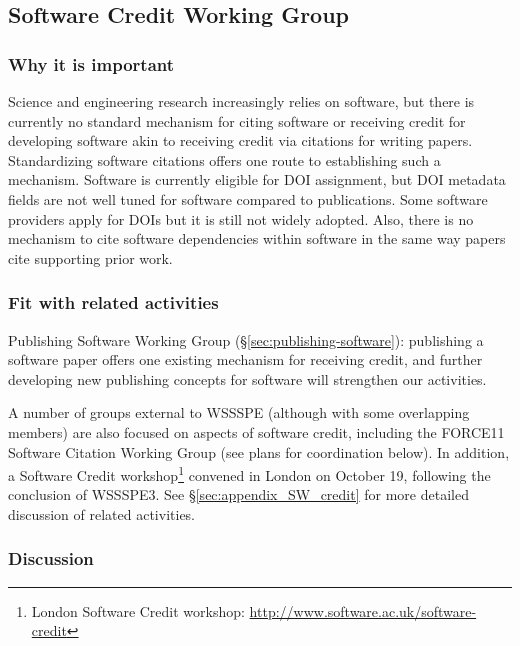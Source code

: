 \subsection{Software Credit Working Group}
\label{sec:software-credit}

\subsubsection{Why it is important}

Science and engineering research increasingly relies on software, but there is currently no standard mechanism for citing software or receiving credit for developing software akin to receiving credit via citations for writing papers.
Standardizing software citations offers one route to establishing such a mechanism.
Software is currently eligible for DOI assignment, but DOI metadata fields are not well tuned for software compared to publications. 
Some software providers apply for DOIs but it is still not widely adopted. 
Also, there is no mechanism to cite software dependencies within software in the same way papers cite supporting prior work.

\subsubsection{Fit with related activities}

Publishing Software Working Group (\S\ref{sec:publishing-software}): publishing a software paper offers one existing mechanism for receiving credit, and further developing new publishing concepts for software will strengthen our activities.

A number of groups external to WSSSPE (although with some overlapping members) are also focused on aspects of software credit, including the FORCE11 Software Citation Working Group (see plans for coordination below).
In addition, a Software Credit workshop\footnote{London Software Credit workshop: \url{http://www.software.ac.uk/software-credit}} convened in London on October 19, following the conclusion of WSSSPE3.
See \S\ref{sec:appendix_SW_credit} for more detailed discussion of related activities.

\subsubsection{Discussion}

